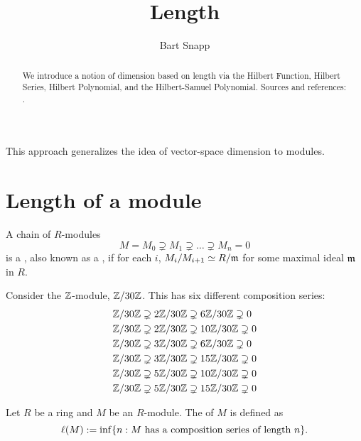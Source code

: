 \documentclass{ximera}
\author{Bart Snapp}
\title{Length}
\begin{document}
\begin{abstract}
  We introduce a notion of dimension based on length via the Hilbert
  Function, Hilbert Series, Hilbert Polynomial, and the Hilbert-Samuel
  Polynomial. Sources and references:
  \cite{AK2012,rA2006,hM1986,hS2003}.
\end{abstract}
\maketitle


This approach generalizes the idea of vector-space dimension to modules. 

\section{Length of a module}





\begin{definition}
  A chain of $R$-modules
  \[
  M = M_0 \supsetneq M_1\supsetneq \dots \supsetneq M_n =0
  \]
  is a , also known as a ,
  if for each $i$, $M_i/M_{i+1}\simeq R/\mathfrak{m}$ for some maximal
  ideal $\mathfrak{m}$ in $R$.
\end{definition}


\begin{example}
  Consider the $\mathbb Z$-module, $\mathbb Z/30\mathbb Z$. This has six different
  composition series:
  \begin{align*}
  &\mathbb Z/30\mathbb Z \supsetneq 2\mathbb Z/30\mathbb Z \supsetneq 6\mathbb Z/30\mathbb Z \supsetneq 0\\
  &\mathbb Z/30\mathbb Z \supsetneq 2\mathbb Z/30\mathbb Z \supsetneq 10\mathbb Z/30\mathbb Z \supsetneq 0\\
  &\mathbb Z/30\mathbb Z \supsetneq 3\mathbb Z/30\mathbb Z \supsetneq 6\mathbb Z/30\mathbb Z \supsetneq 0\\
  &\mathbb Z/30\mathbb Z \supsetneq 3\mathbb Z/30\mathbb Z \supsetneq 15\mathbb Z/30\mathbb Z \supsetneq 0\\
  &\mathbb Z/30\mathbb Z \supsetneq 5\mathbb Z/30\mathbb Z \supsetneq 10\mathbb Z/30\mathbb Z \supsetneq 0\\
  &\mathbb Z/30\mathbb Z \supsetneq 5\mathbb Z/30\mathbb Z \supsetneq 15\mathbb Z/30\mathbb Z \supsetneq 0
  \end{align*}
\end{example}



\begin{definition}
  Let $R$ be a ring and $M$ be an $R$-module. The  of $M$
  is defined as
  \[
  \ell(M) := \inf \{n: \text{$M$ has a composition series of length $n$}\}.
  \]
\end{definition}
\end{document}
